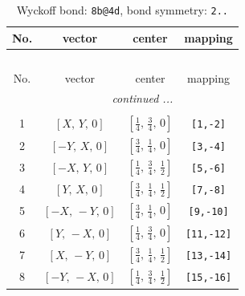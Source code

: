 \documentclass[fleqn,8pt]{jsarticle}
\begin{document}
\begin{longtable}{cccc}
\caption{Wyckoff bond: {\tt 8b@4d}, bond symmetry: {\tt 2..}}
 \\
 \hline \hline
No. & vector & center & mapping \\ \hline \endfirsthead

\multicolumn{3}{l}{\tablename\ \thetable{}} \\
 \hline \hline
No. & vector & center & mapping \\ \hline \endhead

 \hline \hline
\multicolumn{3}{r}{\footnotesize\it continued ...} \\ \endfoot

 \hline \hline
\multicolumn{3}{r}{} \\ \endlastfoot

1 & $\left[ X,\, Y,\, 0 \right]$ & $\left[ \frac{1}{4},\, \frac{3}{4},\, 0 \right]$ & {\tt [1,-2]} \\ \hline
2 & $\left[ - Y,\, X,\, 0 \right]$ & $\left[ \frac{3}{4},\, \frac{1}{4},\, 0 \right]$ & {\tt [3,-4]} \\ \hline
3 & $\left[ - X,\, Y,\, 0 \right]$ & $\left[ \frac{1}{4},\, \frac{3}{4},\, \frac{1}{2} \right]$ & {\tt [5,-6]} \\ \hline
4 & $\left[ Y,\, X,\, 0 \right]$ & $\left[ \frac{3}{4},\, \frac{1}{4},\, \frac{1}{2} \right]$ & {\tt [7,-8]} \\ \hline
5 & $\left[ - X,\, - Y,\, 0 \right]$ & $\left[ \frac{3}{4},\, \frac{1}{4},\, 0 \right]$ & {\tt [9,-10]} \\ \hline
6 & $\left[ Y,\, - X,\, 0 \right]$ & $\left[ \frac{1}{4},\, \frac{3}{4},\, 0 \right]$ & {\tt [11,-12]} \\ \hline
7 & $\left[ X,\, - Y,\, 0 \right]$ & $\left[ \frac{3}{4},\, \frac{1}{4},\, \frac{1}{2} \right]$ & {\tt [13,-14]} \\ \hline
8 & $\left[ - Y,\, - X,\, 0 \right]$ & $\left[ \frac{1}{4},\, \frac{3}{4},\, \frac{1}{2} \right]$ & {\tt [15,-16]} \\
\end{longtable}
\renewcommand{\arraystretch}{1.2}
\end{document}
